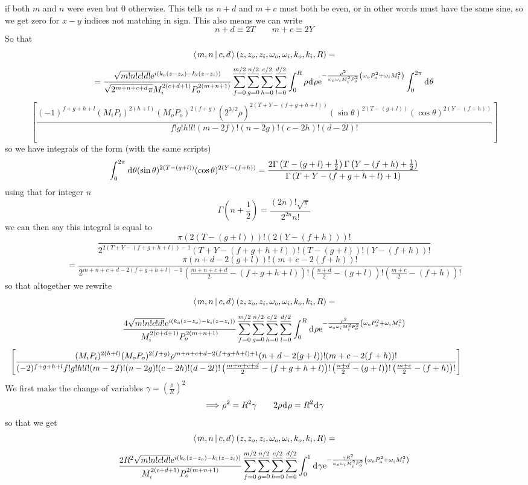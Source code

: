 \documentclass[11pt]{amsart}
\makeatletter
\newcommand{\e}{{\rm e}}				%
\newcommand{\msp}[1]{\mspace{#1mu}}		%
\newcommand{\0}{\varnothing}		%
\DeclareMathOperator*{\im}{\, \Longrightarrow \,}	%
\newcommand{\eq}{\equiv}		%
\newcommand{\dd}{\msp{1} {\rm{d}} \msp{1}}	%
\newcommand{\brac}[2]{\left\langle\msp{2} #1\left\lvert \msp{3.5} #2 \right.\right\rangle}	%
\newcommand{\1}{!}
\newcommand{\2}{@}
\newcommand{\3}{\#}
\newcommand{\4}{\$}
\newcommand{\5}{\%}
\newcommand{\6}{$^\wedge$}
\newcommand{\7}{\&}
\newcommand{\8}{*}
\newcommand{\9}{(}
\makeatother
\begin{document}
if both $m$ and $n$ were even but 0 otherwise. This tells us $n+d$ and $m+c$ must both be even, or in other words must have the same sine, so we get zero for $x-y$ indices not matching in sign. This also means we can write 
\[
n+d \eq 2T\qquad m+c\eq 2Y
\]
So that
\[
\brac{m,n}{c,d}(z,z_o,z_i,\omega_o,\omega_i,k_o,k_i,R) = 
\]
\[
=\frac{\sqrt{m!n!c!d!}\e^{i\left(k_o(z-z_o)-k_i(z-z_i)\right)}}{\sqrt{2^{m+n+c+d}\pi}M_i^{2(c+d+1)}P_o^{2(m+n+1)}}\sum_{f=0}^{\underline{m/2}}\sum_{g=0}^{\underline{n/2}}\sum_{h=0}^{\underline{c/2}}\sum_{l=0}^{\underline{d/2}}\int_0^R \rho \dd \rho \e^{-\frac{\rho^2}{\omega_o\omega_iM_i^2P_o^2}\left(\omega_oP_o^2+\omega_iM_i^2\right)}\int_0^{2\pi}\dd \theta
\]
\[
\left[\frac{(-1)^{f+g+h+l}(M_iP_i)^{2(h+l)}(M_oP_o)^{2(f+g)}(2^{3/2}\rho)^{2(T+Y-(f+g+h+l))}(\sin\theta)^{2(T-(g+l))}(\cos\theta)^{2(Y-(f+h))}}{f!g!h!l!(m-2f)!(n-2g)!(c-2h)!(d-2l)!}\right]
\]
so we have integrals of the form (with the same scripts)
\[
\int_0^{2\pi}\dd \theta (\sin\theta)^{2(T-(g+l))}(\cos\theta)^{2(Y-(f+h))} = \frac{2\Gamma\left(T-(g+l)+\frac{1}{2}\right)\Gamma\left(Y-(f+h)+\frac{1}{2}\right)}{\Gamma\left(T+Y-(f+g+h+l)+1\right)}
\]
using that for integer $n$
\[
\Gamma\left(n+\frac{1}{2}\right)=\frac{(2n)!\sqrt{\pi}}{2^{2n}n!}
\]
we can then say this integral is equal to 
\[
\frac{\pi(2(T-(g+l)))!(2(Y-(f+h)))!}{2^{2(T+Y-(f+g+h+l))-1}(T+Y-(f+g+h+l))!(T-(g+l))!(Y-(f+h))!}
\]
\[
=\frac{\pi(n+d-2(g+l))!(m+c-2(f+h))!}{2^{m+n+c+d-2(f+g+h+l)-1}\left(\frac{m+n+c+d}{2}-(f+g+h+l)\right)!\left(\frac{n+d}{2}-(g+l)\right)!\left(\frac{m+c}{2}-(f+h)\right)!}
\]
so that altogether we rewrite
\[
\brac{m,n}{c,d}(z,z_o,z_i,\omega_o,\omega_i,k_o,k_i,R) = 
\]
\[
\frac{4\sqrt{ m!n!c!d!}\e^{i\left(k_o(z-z_o)-k_i(z-z_i)\right)}}{M_i^{2(c+d+1)}P_o^{2(m+n+1)}}\sum_{f=0}^{\underline{m/2}}\sum_{g=0}^{\underline{n/2}}\sum_{h=0}^{\underline{c/2}}\sum_{l=0}^{\underline{d/2}}\int_0^R  \dd \rho \e^{-\frac{\rho^2}{\omega_o\omega_iM_i^2P_o^2}\left(\omega_oP_o^2+\omega_iM_i^2\right)}
\]
\[
\msp{-120}\left[\frac{(M_iP_i)^{2(h+l)}(M_oP_o)^{2(f+g)}\rho^{m+n+c+d-2(f+g+h+l)+1}(n+d-2(g+l))!(m+c-2(f+h))!}{(-2)^{f+g+h+l}f!g!h!l!(m-2f)!(n-2g)!(c-2h)!(d-2l)!\left(\frac{m+n+c+d}{2}-(f+g+h+l)\right)!\left(\frac{n+d}{2}-(g+l)\right)!\left(\frac{m+c}{2}-(f+h)\right)!}\right]
\]
We first make the change of variables $\gamma =\left(\frac{\rho}{R}\right)^2$
\[
\im \rho^2 =  R^2\gamma \qquad 2\rho \dd \rho = R^2\dd \gamma
\]
so that we get
\[
\brac{m,n}{c,d}(z,z_o,z_i,\omega_o,\omega_i,k_o,k_i,R) = 
\]
\[
\frac{2R^2\sqrt{ m!n!c!d!}\e^{i\left(k_o(z-z_o)-k_i(z-z_i)\right)}}{M_i^{2(c+d+1)}P_o^{2(m+n+1)}}\sum_{f=0}^{\underline{m/2}}\sum_{g=0}^{\underline{n/2}}\sum_{h=0}^{\underline{c/2}}\sum_{l=0}^{\underline{d/2}}\int_0^1  \dd \gamma \e^{-\frac{\gamma R^2}{\omega_o\omega_iM_i^2P_o^2}\left(\omega_oP_o^2+\omega_iM_i^2\right)}
\]
\end{document}
